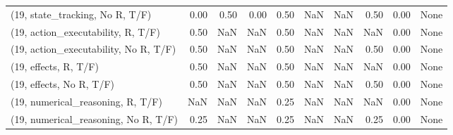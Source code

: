 \begin{table*}[h!]
\begin{adjustbox}{width=2\columnwidth,center}
\begin{tabular}{lrrr|rrr|rrr}
(19, state\_tracking, No R, T/F)       &                      0.00 &                  0.50 &                      0.00 &                          0.50 &                       NaN &                           NaN &                                   0.50 &                               0.00 &                                  None \\
(19, action\_executability, R, T/F)    &                      0.50 &                   NaN &                       NaN &                          0.50 &                       NaN &                           NaN &                                    NaN &                               0.00 &                                  None \\
(19, action\_executability, No R, T/F) &                      0.50 &                   NaN &                       NaN &                          0.50 &                       NaN &                           NaN &                                   0.50 &                               0.00 &                                  None \\
(19, effects, R, T/F)                 &                      0.50 &                   NaN &                       NaN &                          0.50 &                       NaN &                           NaN &                                    NaN &                               0.00 &                                  None \\
(19, effects, No R, T/F)              &                      0.50 &                   NaN &                       NaN &                          0.50 &                       NaN &                           NaN &                                   0.50 &                               0.00 &                                  None \\
(19, numerical\_reasoning, R, T/F)     &                       NaN &                   NaN &                       NaN &                          0.25 &                       NaN &                           NaN &                                    NaN &                               0.00 &                                  None \\
(19, numerical\_reasoning, No R, T/F)  &                      0.25 &                   NaN &                       NaN &                          0.25 &                       NaN &                           NaN &                                   0.25 &                               0.00 &                                  None \\

\end{tabular}
\end{adjustbox}
\end{table*}
